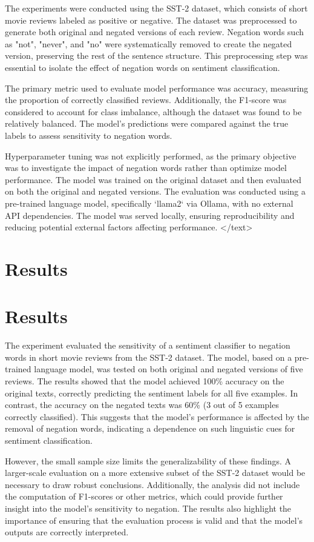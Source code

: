\documentclass{article}
\begin{document}
The experiments were conducted using the SST-2 dataset, which consists of short movie reviews labeled as positive or negative. The dataset was preprocessed to generate both original and negated versions of each review. Negation words such as "not", "never", and "no" were systematically removed to create the negated version, preserving the rest of the sentence structure. This preprocessing step was essential to isolate the effect of negation words on sentiment classification.

The primary metric used to evaluate model performance was accuracy, measuring the proportion of correctly classified reviews. Additionally, the F1-score was considered to account for class imbalance, although the dataset was found to be relatively balanced. The model's predictions were compared against the true labels to assess sensitivity to negation words.

Hyperparameter tuning was not explicitly performed, as the primary objective was to investigate the impact of negation words rather than optimize model performance. The model was trained on the original dataset and then evaluated on both the original and negated versions. The evaluation was conducted using a pre-trained language model, specifically `llama2` via Ollama, with no external API dependencies. The model was served locally, ensuring reproducibility and reducing potential external factors affecting performance.
</text>
\section{Results}
\section{Results}

The experiment evaluated the sensitivity of a sentiment classifier to negation words in short movie reviews from the SST-2 dataset. The model, based on a pre-trained language model, was tested on both original and negated versions of five reviews. The results showed that the model achieved 100\% accuracy on the original texts, correctly predicting the sentiment labels for all five examples. In contrast, the accuracy on the negated texts was 60\% (3 out of 5 examples correctly classified). This suggests that the model's performance is affected by the removal of negation words, indicating a dependence on such linguistic cues for sentiment classification.

However, the small sample size limits the generalizability of these findings. A larger-scale evaluation on a more extensive subset of the SST-2 dataset would be necessary to draw robust conclusions. Additionally, the analysis did not include the computation of F1-scores or other metrics, which could provide further insight into the model's sensitivity to negation. The results also highlight the importance of ensuring that the evaluation process is valid and that the model's outputs are correctly interpreted.
\end{document}
